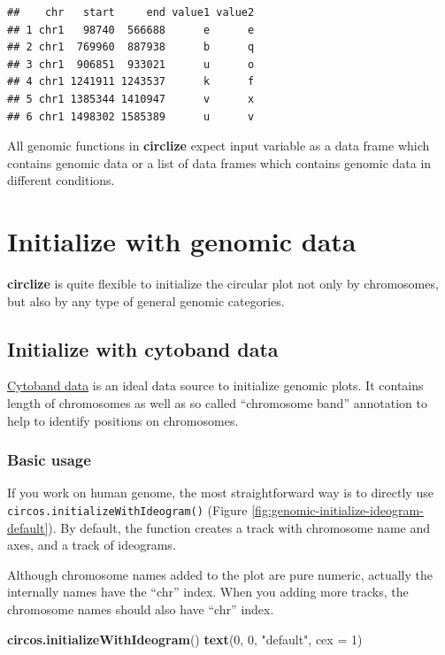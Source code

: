\documentclass[]{book}
\newenvironment{Shaded}{\begin{snugshade}}{\end{snugshade}}
\newcommand{\KeywordTok}[1]{\textcolor[rgb]{0.13,0.29,0.53}{\textbf{#1}}}
\newcommand{\DataTypeTok}[1]{\textcolor[rgb]{0.13,0.29,0.53}{#1}}
\newcommand{\DecValTok}[1]{\textcolor[rgb]{0.00,0.00,0.81}{#1}}
\newcommand{\StringTok}[1]{\textcolor[rgb]{0.31,0.60,0.02}{#1}}
\newcommand{\NormalTok}[1]{#1}
\begin{document}
\begin{verbatim}
##    chr   start     end value1 value2
## 1 chr1   98740  566688      e      e
## 2 chr1  769960  887938      b      q
## 3 chr1  906851  933021      u      o
## 4 chr1 1241911 1243537      k      f
## 5 chr1 1385344 1410947      v      x
## 6 chr1 1498302 1585389      u      v
\end{verbatim}

All genomic functions in \textbf{circlize} expect input variable as a
data frame which contains genomic data or a list of data frames which
contains genomic data in different conditions.

\chapter{Initialize with genomic data}\label{initialize-genomic-plot}

\textbf{circlize} is quite flexible to initialize the circular plot not
only by chromosomes, but also by any type of general genomic categories.

\section{Initialize with cytoband data}\label{initialize-cytoband}

\href{https://genome.ucsc.edu/cgi-bin/hgTables?hgta_table=cytoBand\&hgta_doSchema=describe\%20table\%20schema}{Cytoband
data} is an ideal data source to initialize genomic plots. It contains
length of chromosomes as well as so called ``chromosome band''
annotation to help to identify positions on chromosomes.

\subsection{Basic usage}\label{basic-usage}

If you work on human genome, the most straightforward way is to directly
use \texttt{circos.initializeWithIdeogram()} (Figure
\ref{fig:genomic-initialize-ideogram-default}). By default, the function
creates a track with chromosome name and axes, and a track of ideograms.

Although chromosome names added to the plot are pure numeric, actually
the internally names have the ``chr'' index. When you adding more
tracks, the chromosome names should also have ``chr'' index.

\begin{Shaded}
\begin{Highlighting}[]
\KeywordTok{circos.initializeWithIdeogram}\NormalTok{()}
\KeywordTok{text}\NormalTok{(}\DecValTok{0}\NormalTok{, }\DecValTok{0}\NormalTok{, }\StringTok{"default"}\NormalTok{, }\DataTypeTok{cex =} \DecValTok{1}\NormalTok{)}
\end{Highlighting}
\end{Shaded}
\end{document}
